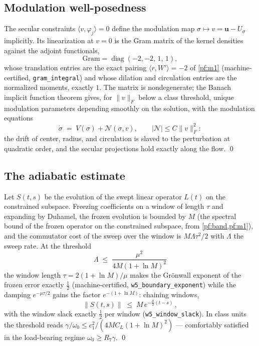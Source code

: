 \documentclass[11pt,letterpaper]{amsart}
\theoremstyle{definition}
\theoremstyle{remark}
\newcommand{\om}{\omega}
\newcommand{\uu}{\boldsymbol{u}}
\newcommand{\norm}[1]{\lVert #1 \rVert}
\newcommand{\abs}[1]{\lvert #1 \rvert}
\begin{document}
\subsection{Modulation well-posedness}\label{pf:w4}
The secular constraints $\langle v,\varphi_j\rangle=0$ define the modulation map
$\sigma\mapsto v=\uu-U_\sigma$ implicitly. Its linearization at $v=0$ is the Gram
matrix of the kernel densities against the adjoint functionals,
\[
\mathrm{Gram}=\operatorname{diag}(-2,-2,\,1,\,1),
\]
whose translation entries are the exact pairing $\langle r,W'\rangle=-2$ of
\cref{pf:m1} (machine-certified, \texttt{gram\_integral}) and whose dilation and
circulation entries are the normalized moments, exactly $1$. The matrix is
nondegenerate; the Banach implicit function theorem gives, for
$\norm{v}_F$ below a class threshold, unique modulation parameters depending smoothly
on the solution, with the modulation equations
\[
\dot\sigma\;=\;V(\sigma)+\mathcal{N}(\sigma,v),\qquad
\abs{\mathcal{N}}\le C\norm{v}_F^2 :
\]
the drift of center, radius, and circulation is slaved to the perturbation at
quadratic order, and the secular projections hold exactly along the flow. \qed

\subsection{The adiabatic estimate}\label{pf:w5}
Let $S(t,s)$ be the evolution of the swept linear operator $L(t)$ on the constrained
subspace. Freezing coefficients on a window of length $\tau$ and expanding by Duhamel,
the frozen evolution is bounded by $M$ (the spectral bound of the frozen operator on
the constrained subspace, from \cref{pf:band,pf:m1}), and the commutator cost of the
sweep over the window is $M\Lambda\tau^2/2$ with $\Lambda$ the sweep rate. At the
threshold
\[
\Lambda\;\le\;\frac{\mu^2}{4M(1+\ln M)^2}
\]
the window length $\tau=2(1+\ln M)/\mu$ makes the Gr\"onwall exponent of the frozen
error exactly $\tfrac12$ (machine-certified, \texttt{w5\_boundary\_exponent}) while
the damping $e^{-\mu\tau/2}$ gains the factor $e^{-(1+\ln M)}$: chaining windows,
\[
\norm{S(t,s)}\;\le\;M\,e^{-\frac{\mu}{2}(t-s)}\,,
\]
with the window slack exactly $\tfrac12$ per window (\texttt{w5\_window\_slack}). In
class units the threshold reads $\gamma/\om_0\le c_1^2/(4MC_L(1+\ln M)^2)$ ---
comfortably satisfied in the load-bearing regime $\om_0\ge R_7\gamma$. \qed
\end{document}
